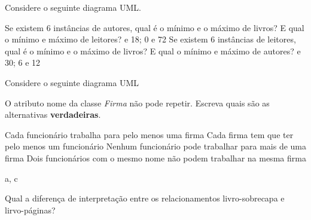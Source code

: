 \documentclass{lib/eng_softdoc}
\begin{document}
\vspace{0.5cm}

\problem Considere o seguinte diagrama UML. 

\vspace{0.5cm}

\vspace{0.5cm}
\subproblem Se existem 6 instâncias de autores, qual é o mínimo e o máximo de livros? E qual o mínimo e máximo de leitores?
 e 18; 0 e 72
\subproblem Se existem 6 instâncias de leitores, qual é o mínimo e o máximo de livros? E qual o mínimo e máximo de autores?
 e 30; 6 e 12

\vspace{0.5cm}

\problem Considere o seguinte diagrama UML 

\vspace{0.5cm}

\vspace{0.5cm}
O atributo nome da classe \textit{Firma} não pode repetir. Escreva quais são as alternativas \textbf{verdadeiras}.

\subproblem Cada funcionário trabalha para pelo menos uma firma
\subproblem Cada firma tem que ter pelo menos um funcionário  
\subproblem Nenhum funcionário pode trabalhar para mais de uma firma
\subproblem Dois funcionários com o mesmo nome não podem trabalhar na mesma firma 

\vspace{0.5cm}
\answer a, c

\problem Qual a diferença de interpretação entre os relacionamentos livro-sobrecapa e lirvo-páginas? 

\vspace{0.5cm}
\end{document}
